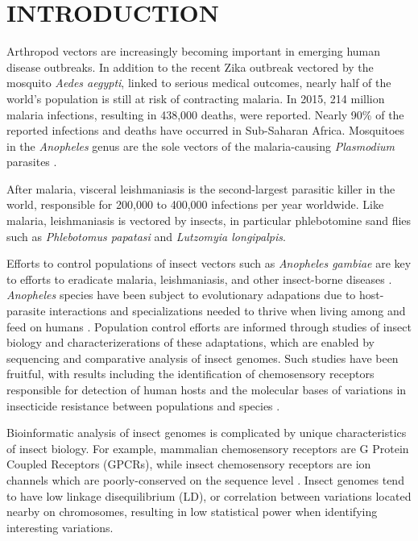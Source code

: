 \chapter{\uppercase{Introduction}}

Arthropod vectors are increasingly becoming important in emerging human disease outbreaks.  In addition to the recent Zika outbreak vectored by the mosquito \emph{Aedes aegypti}, linked to serious medical outcomes, nearly half of the world's population is still at risk of contracting malaria.  In 2015, 214 million malaria infections, resulting in 438,000 deaths, were reported. Nearly 90\% of the reported infections and deaths have occurred in Sub-Saharan Africa.  Mosquitoes in the \emph{Anopheles} genus are the sole vectors of the malaria-causing \emph{Plasmodium} parasites \cite{Neafsey2015,Neafsey2010,Lawniczak2010}.

After malaria, visceral leishmaniasis is the second-largest parasitic killer in the world, responsible for 200,000 to 400,000 infections per year worldwide.  Like malaria, leishmaniasis is vectored by insects, in particular phlebotomine sand flies such as \emph{Phlebotomus papatasi} and \emph{Lutzomyia longipalpis}.

Efforts to control populations of insect vectors such as \emph{Anopheles gambiae} are key to efforts to eradicate malaria, leishmaniasis, and other insect-borne diseases \cite{Holt2002}.  \emph{Anopheles} species have been subject to evolutionary adapations due to host-parasite interactions and specializations needed to thrive when living among and feed on humans \cite{Neafsey2015}. Population control efforts are informed through studies of insect biology and characterizerations of these adaptations, which are enabled by sequencing and comparative analysis of insect genomes.   Such studies have been fruitful, with results including the identification of chemosensory receptors responsible for detection of human hosts and the molecular bases of variations in insecticide resistance between populations and species \cite{Lawniczak2010}.

Bioinformatic analysis of insect genomes is complicated by unique characteristics of insect biology.  For example, mammalian chemosensory receptors are G Protein Coupled Receptors (GPCRs), while insect chemosensory receptors are ion channels which are poorly-conserved on the sequence level \cite{Sato2008,Touhara2009,Wicher2008}.  Insect genomes tend to have low linkage disequilibrium (LD), or correlation  between variations located nearby on chromosomes, resulting in low statistical power when identifying interesting variations.

